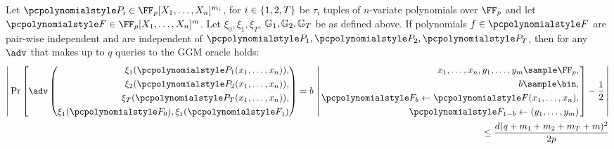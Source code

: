 \documentclass[runningheads,11pt]{llncs}
\begin{document}
\begin{theorem}
  \label{thm:uber_assumption}
  Let $\p{P}_i \in \FF_p[X_1, \ldots, X_n]^{m_i}$, for
  $i \in \{1, 2, T\}$ be $\tau_i$ tuples of $n$-variate polynomials over
  $\FF_p$ and let $\p{F} \in \FF_p[X_1, \ldots, X_n]^m$. Let
  $\xi_0, \xi_1, \xi_T$, $\mathbb{G}_1, \mathbb{G}_2, \mathbb{G}_T$ be as defined above. If
  polynomials $f \in \p{F}$ are pair-wise independent and are independent of
  $\p{P}_1, \p{P}_2, \p{P}_T$, then for any $\adv$ that makes up to $q$ queries to the
  GGM oracle holds:
  \begin{equation*}
    \begin{split}
     \left|\,
    \Pr\left[
    \adv\left(
      \begin{aligned}
        \xi_1(\p{P}_1(x_1, \ldots, x_n)), \\
        \xi_2(\p{P}_2(x_1, \ldots, x_n)), \\
        \xi_T(\p{P}_T(x_1, \ldots, x_n)), \\
        \xi_{1}(\p{F}_0), \xi_{1}(\p{F}_1)
      \end{aligned}
    \right) = b
    \, \left|\,
      \begin{aligned}
        x_1, \ldots, x_n, y_1, \ldots, y_m \sample \FF_p,\\
        b \sample \bin, \\
        \p{F}_b \gets \p{F}(x_1, \ldots, x_n),\\
        \p{F}_{1 - b} \gets (y_1, \ldots, y_m)
      \end{aligned}
    \right.  \right] - \frac{1}{2} \, \right| \\
     \leq \frac{d(q + m_1 + m_2 + m_T +
      m)^2 }{2p}
    \end{split}
  \end{equation*}
\end{theorem}
\end{document}
